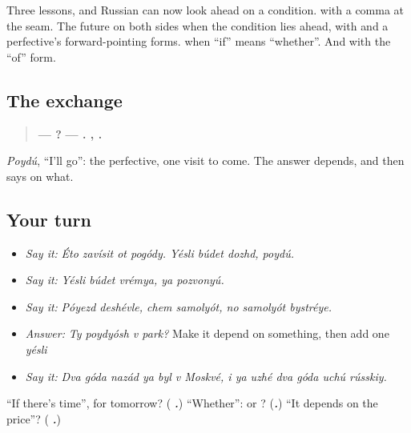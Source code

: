\begin{grammarlens}[title={What you've built}]
Three lessons, and Russian can now look ahead on a condition. \textbf{} with a comma at the seam. The future on both sides when the condition lies ahead, with \textbf{} and a perfective's forward-pointing forms. \textbf{} when \textquotedblleft{}if\textquotedblright{} means \textquotedblleft{}whether\textquotedblright{}. And \textbf{  } with the \textquotedblleft{}of\textquotedblright{} form.
\end{grammarlens}

\subsection*{The exchange}
\begin{quote}
\textbf{—      ?} \textbf{—    .   , .}
\end{quote}

\emph{Poydú}, \textquotedblleft{}I'll go\textquotedblright{}: the perfective, one visit to come. The answer depends, and then says on what.

\subsection*{Your turn}
\begin{itemize}
\raggedright
  \item \emph{Say it:} \emph{Éto zavísit ot pogódy. Yésli búdet dozhd, poydú.}
  \item \emph{Say it:} \emph{Yésli búdet vrémya, ya pozvonyú.}
  \item \emph{Say it:} \emph{Póyezd deshévle, chem samolyót, no samolyót bystréye.}
  \item \emph{Answer:} \emph{Ty poydyósh v park?} Make it depend on something, then add one \emph{yésli}
  \item \emph{Say it:} \emph{Dva góda nazád ya byl v Moskvé, i ya uzhé dva góda uchú rússkiy.}
\end{itemize}

\begin{tcolorbox}[breakable,colback=teal!4,colframe=teal!35!black,title={Before you move on}]
\textquotedblleft{}If there's time\textquotedblright{}, for tomorrow? (\emph{\textbf{  .}}) \textquotedblleft{}Whether\textquotedblright{}: \emph{} or \emph{}? (\emph{\textbf{.}}) \textquotedblleft{}It depends on the price\textquotedblright{}? (\emph{\textbf{   .}})
\end{tcolorbox}
